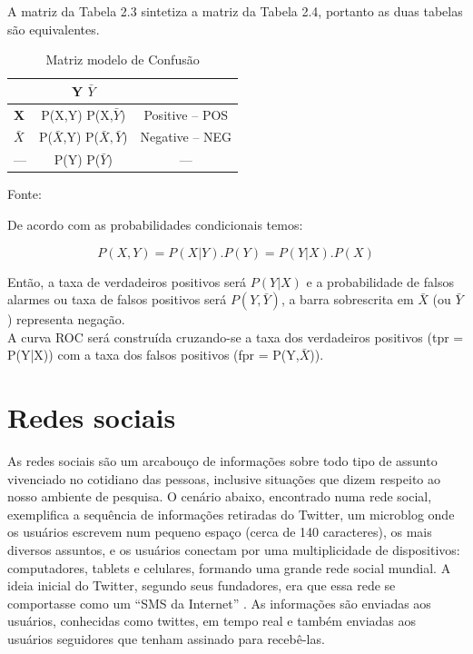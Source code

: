 A matriz da Tabela 2.3 sintetiza a matriz da Tabela 2.4, portanto as duas tabelas são equivalentes.

\begin{table}[ht]
\centering
\caption{Matriz modelo de Confusão}
\vspace{1mm}
\begin{tabular}{l|c|c}
\hline
\textbf{}           & \textbf{Y}     \textbf{$\bar{Y}$}   & \textbf{}\\
\hline
\textbf{X}          & P(X,Y)         P(X,$\bar{Y}$)       & Positive -- POS\\
\textbf{$\bar{X}$}  & P($\bar{X}$,Y) P($\bar{X},\bar{Y}$) & Negative -- NEG\\
\hline
   ---              & P(Y)           P($\bar{Y}$)         &     ---        \\
\end{tabular}
\tiny Fonte: \cite{Bradley1997}
\end{table}


De acordo com as probabilidades condicionais temos:

\begin{equation}
 P(X,Y) = P(X|Y).P(Y) = P(Y|X).P(X)
\end{equation}

Então, a taxa de verdadeiros positivos será $P(Y|X)$ e a probabilidade de falsos alarmes ou taxa de falsos positivos será $P(Y,\bar{Y})$, a barra sobrescrita em $\bar{X}$
(ou $\bar{Y}$) representa negação. \\
A curva ROC será construída cruzando-se a taxa dos verdadeiros positivos (tpr = P(Y|X)) com a taxa dos falsos positivos (fpr = P(Y,$\bar{X}$)).

\pagebreak

\section{Redes sociais}

As redes sociais são um arcabouço de informações sobre todo tipo de assunto vivenciado no cotidiano das pessoas, inclusive situações que dizem respeito ao nosso ambiente de pesquisa.
O cenário abaixo, encontrado numa rede social, exemplifica a sequência de informações retiradas do Twitter, um microblog onde os usuários escrevem num pequeno espaço (cerca de 140 caracteres), 
os mais diversos assuntos, e os usuários conectam por uma multiplicidade de dispositivos: computadores, tablets e celulares, formando uma grande rede social mundial. 
A ideia inicial do Twitter, segundo seus fundadores, era que essa rede se comportasse como um ``SMS da Internet'' \cite{Twitter2015}. 
As informações são enviadas aos usuários, conhecidas como twittes, em tempo real e também enviadas aos usuários seguidores que tenham assinado para recebê-las.

